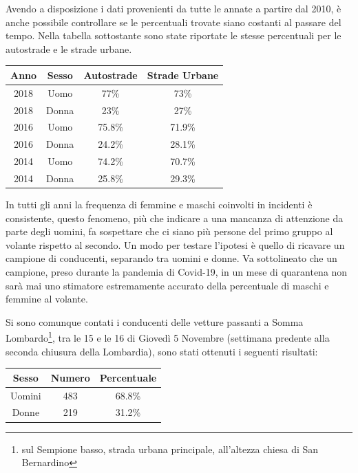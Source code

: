 \documentclass[a4paper,12pt]{report}
\begin{document}
Avendo a disposizione i dati provenienti da tutte le annate a partire dal 2010, 
è anche possibile controllare se le percentuali trovate siano costanti al 
passare del tempo.
Nella tabella sottostante sono state riportate le stesse percentuali per le 
autostrade e le strade urbane.

\begin{center}
    \def\arraystretch{1.5}%
    \begin{tabular}{ |c|c|c|c| }
        \hline
        Anno & Sesso & Autostrade & Strade Urbane \\ 
        \hline
        \rowcolor{TableGray}
        2018 & Uomo & 77\%  & 73\% \\
        2018 & Donna & 23\% & 27\% \\
        \rowcolor{TableGray}
        2016 & Uomo & 75.8\%  & 71.9\% \\
        2016 & Donna & 24.2\% & 28.1\% \\
        \rowcolor{TableGray}
        2014 & Uomo & 74.2\%  & 70.7\% \\
        2014 & Donna & 25.8\% & 29.3\% \\
        \hline
    \end{tabular}
\end{center}

In tutti gli anni la frequenza di femmine e maschi coinvolti in incidenti è consistente, 
questo fenomeno, più che indicare a una mancanza di attenzione da parte degli uomini, 
fa sospettare che ci siano più persone del primo gruppo al volante rispetto al secondo.
Un modo per testare l'ipotesi è quello di ricavare un campione di conducenti, 
separando tra uomini e donne.
Va sottolineato che un campione, preso durante la pandemia di Covid-19, in un 
mese di quarantena non sarà mai uno stimatore estremamente accurato della percentuale 
di maschi e femmine al volante.

Si sono comunque contati i conducenti delle vetture passanti a Somma 
Lombardo\footnote{sul Sempione basso, strada urbana principale, all'altezza 
chiesa di San Bernardino}, 
tra le 15 e le 16 di Giovedì 5 Novembre 
(settimana predente alla seconda chiusura della Lombardia), 
sono stati ottenuti i seguenti risultati:

\begin{center}
    \def\arraystretch{1.5}%
    \begin{tabular}{ |c|c|c| }
        \hline
        Sesso & Numero & Percentuale \\ 
        \hline
        \rowcolor{TableGray}
        Uomini & 483 & 68.8\% \\
        Donne & 219 & 31.2\% \\
        \hline
    \end{tabular}
\end{center}
\end{document}
